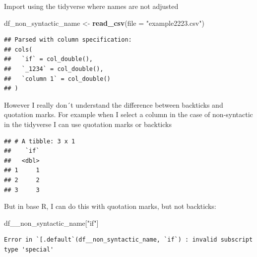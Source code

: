 \documentclass[]{book}
\newenvironment{Shaded}{\begin{snugshade}}{\end{snugshade}}
\newcommand{\DataTypeTok}[1]{\textcolor[rgb]{0.13,0.29,0.53}{#1}}
\newcommand{\KeywordTok}[1]{\textcolor[rgb]{0.13,0.29,0.53}{\textbf{#1}}}
\newcommand{\NormalTok}[1]{#1}
\newcommand{\OperatorTok}[1]{\textcolor[rgb]{0.81,0.36,0.00}{\textbf{#1}}}
\newcommand{\StringTok}[1]{\textcolor[rgb]{0.31,0.60,0.02}{#1}}
\begin{document}
Import using the tidyverse where names are not adjusted

\begin{Shaded}
\begin{Highlighting}[]
\NormalTok{df_non_syntactic_name  <-}\StringTok{ }\KeywordTok{read_csv}\NormalTok{(}\DataTypeTok{file =} \StringTok{"example2223.csv"}\NormalTok{)}
\end{Highlighting}
\end{Shaded}

\begin{verbatim}
## Parsed with column specification:
## cols(
##   `if` = col_double(),
##   `_1234` = col_double(),
##   `column 1` = col_double()
## )
\end{verbatim}

However I really don´t understand the difference between backticks and quotation marks. For example when I select a column in the case of non-syntactic in the tidyverse I can use quotation marks or backticks

\begin{Shaded}
\end{Shaded}

\begin{verbatim}
## # A tibble: 3 x 1
##    `if`
##   <dbl>
## 1     1
## 2     2
## 3     3
\end{verbatim}

\begin{Shaded}
\end{Shaded}

But in base R, I can do this with quotation marks, but not backticks:

\begin{Shaded}
\begin{Highlighting}[]
\NormalTok{df__non_syntactic_name[}\StringTok{"if"}\NormalTok{]}
\end{Highlighting}
\end{Shaded}

\begin{verbatim}
Error in `[.default`(df__non_syntactic_name, `if`) : invalid subscript type 'special'
\end{verbatim}
\end{document}
